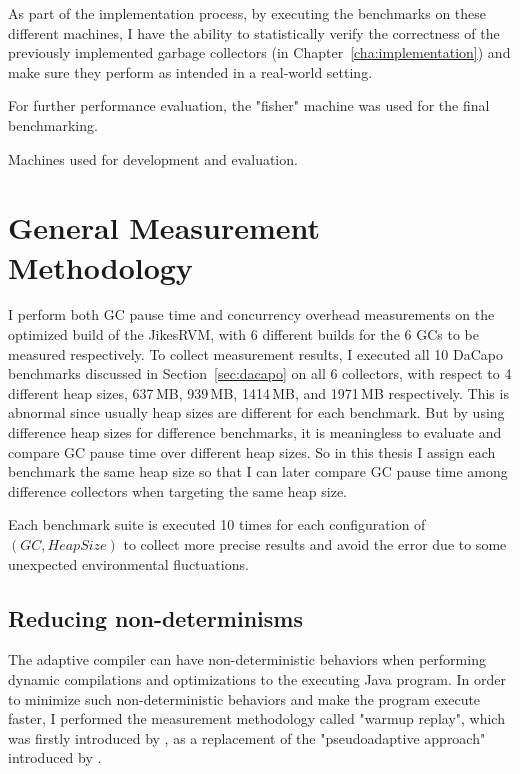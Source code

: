 As part of the implementation process,
by executing the benchmarks on these different machines,
I have the ability to statistically verify the correctness of the previously
implemented garbage collectors (in Chapter~\ref{cha:implementation})
and make sure they perform as intended in a real-world setting.

For further performance evaluation, the "fisher" machine was used for the final benchmarking.

\begin{table*}
  \centering
  
  \caption{Machines used for development and evaluation.}
  \label{tab:machines}
\end{table*}

\section{General Measurement Methodology}
\label{sec:generalmethod}

I perform both GC pause time and concurrency overhead measurements on the optimized build
of the JikesRVM, with 6 different builds for the 6 GCs to be measured respectively.
To collect measurement results, I executed all 10 DaCapo benchmarks discussed in Section~\ref{sec:dacapo}
on all 6 collectors, with respect to 4 different heap sizes, 637\,MB, 939\,MB, 1414\,MB, and 1971\,MB
respectively. This is abnormal since usually heap sizes are different for each benchmark. But by using difference
heap sizes for difference benchmarks, it is meaningless to evaluate and compare
GC pause time over different heap sizes. So in this thesis I assign each benchmark the
same heap size so that I can later compare GC pause time among difference collectors when
targeting the same heap size.

Each benchmark suite is executed 10 times for each configuration of $(GC, HeapSize)$ to
collect more precise results and avoid the error due to some unexpected environmental fluctuations.

\subsection{Reducing non-determinisms}
\label{subsec:nondeterminisms}

The adaptive compiler can have non-deterministic behaviors when performing dynamic
compilations and optimizations to the executing Java program. In order to minimize
such non-deterministic behaviors and make the program execute faster, I performed
the measurement methodology called "warmup replay", which was firstly introduced by
\cite{yang2012barriers}, as a replacement of the "pseudoadaptive approach" introduced by \cite{blackburn2004barriers}.


